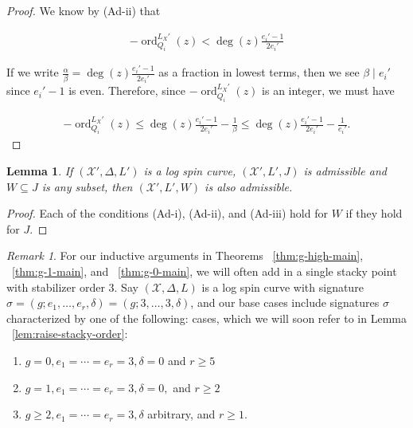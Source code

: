 \documentclass{amsart}
\theoremstyle{plain}
\newtheorem{lem}[thm]{Lemma}
\theoremstyle{definition}
\theoremstyle{remark}
\newtheorem{rem}[thm]{Remark}
\numberwithin{equation}{section}
\newcommand \sx{\mathscr X}
\DeclareMathOperator{\ord}{ord}
\newcommand \subhalf[1]{\frac{{#1} - 1}{2{#1}}}
\newcommand{\halfcan}{L}
\begin{document}
\begin{proof}
We know by (Ad-ii) that

\begin{align*}
	-\ord_{Q_i}
^{\halfcan_X'}(z) < \deg(z) \subhalf{e_i'}
\end{align*}

\noindent
If we write $\frac{\alpha}{\beta} = \deg(z) \frac{e_i'- 1}{2e_i'}$ 
as a fraction in lowest terms, then we see $\beta \mid e_i'$ since $
e_i'- 1$ is even. Therefore, since $-\ord_{Q_i}
^{\halfcan_X'}(z)$ is an integer, 
we must have

\begin{align*}
	-\ord_{Q_i}
^{\halfcan_X'}(z) \leq \deg(z) \subhalf{e_i'} - \frac{1}{\beta} \leq 
	\deg(z) \subhalf{e_i'} - \frac{1}{e_i'}.
\end{align*}
\end{proof}

\begin{lem}
\label{lem:admissible_subset}
If $(\sx',\Delta,L')$ is a log spin curve, $(\sx',L', J)$ is admissible and $W \subseteq J$ is any subset,
then $(\sx', L', W)$ is also admissible.
\end{lem}

\begin{proof}
Each of the conditions (Ad-i), (Ad-ii), and (Ad-iii) hold for $W$
if they hold for $J$.
\end{proof}

\begin{rem}
\label{rem:three-cases}
For our inductive arguments in Theorems ~\ref{thm:g-high-main}, ~\ref{thm:g-1-main}, and ~\ref{thm:g-0-main}, we will often add in a single
stacky point with stabilizer order $3$. Say $(\sx,\Delta,\halfcan)$ is a log spin
curve with signature $\sigma = (g;e_1,\ldots, e_r,\delta) = (g;3,\ldots, 3,
\delta)$, and our base cases include signatures $\sigma$ characterized by one of the following: cases, which we will soon refer to in Lemma ~\ref{lem:raise-stacky-order}:
\begin{enumerate}
	\item $g = 0, e_1 = \cdots = e_r = 3, \delta = 0$ and $r \geq 5$
	\item $g = 1, e_1 = \cdots = e_r = 3, \delta = 0,$ and $ r \geq 2$
	\item $g \geq 2, e_1 = \cdots = e_r = 3, \delta$ arbitrary, and $r \geq 1$.
\end{enumerate}
\end{rem}
\end{document}

